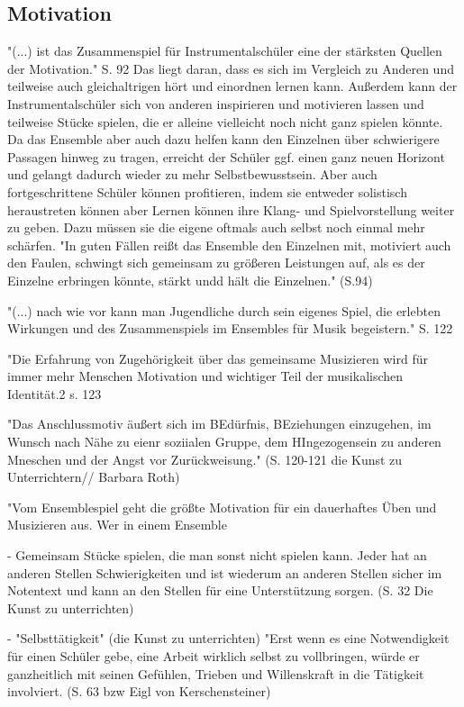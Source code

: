 \subsection{Motivation}
"(...) ist das Zusammenspiel für Instrumentalschüler eine der stärksten Quellen
der Motivation." S. 92 Das liegt daran, dass es sich im Vergleich zu Anderen und
teilweise auch gleichaltrigen hört und einordnen lernen kann. Außerdem kann der Instrumentalschüler
sich von anderen inspirieren und motivieren lassen und teilweise Stücke spielen,
die er alleine vielleicht noch nicht ganz spielen könnte. Da das Ensemble aber
auch dazu helfen kann den Einzelnen über schwierigere Passagen hinweg zu tragen,
erreicht der Schüler ggf. einen ganz neuen Horizont und gelangt dadurch wieder
zu mehr Selbstbewusstsein. Aber auch fortgeschrittene Schüler können
profitieren, indem sie entweder solistisch heraustreten können aber Lernen
können ihre Klang- und Spielvorstellung weiter zu geben. Dazu müssen sie die
eigene oftmals auch selbst noch einmal mehr schärfen. "In guten Fällen reißt das
Ensemble den Einzelnen mit, motiviert auch den Faulen, schwingt sich gemeinsam
zu größeren Leistungen auf, als es der Einzelne erbringen könnte, stärkt undd
hält die Einzelnen." (S.94)


"(...) nach wie vor kann man Jugendliche durch sein eigenes Spiel, die erlebten
Wirkungen und des Zusammenspiels im Ensembles für Musik begeistern." S. 122


"Die Erfahrung von Zugehörigkeit über das gemeinsame Musizieren wird für immer
mehr Menschen Motivation und wichtiger Teil der musikalischen Identität.2 s. 123

"Das Anschlussmotiv äußert sich im BEdürfnis, BEziehungen einzugehen, im Wunsch
nach Nähe zu eienr soziialen Gruppe, dem HIngezogensein zu anderen Mneschen und
der Angst vor Zurückweisung." (S. 120-121 die Kunst zu Unterrichtern// Barbara Roth)

"Vom Ensemblespiel geht die größte Motivation für ein dauerhaftes Üben und
Musizieren aus. Wer in einem Ensemble 



- Gemeinsam Stücke spielen, die man sonst nicht spielen kann. Jeder hat an
anderen Stellen Schwierigkeiten und ist wiederum an anderen Stellen sicher im
Notentext und kann an den Stellen für eine Unterstützung sorgen. (S. 32 Die
Kunst zu unterrichten)

- "Selbsttätigkeit" (die Kunst zu unterrichten)
"Erst wenn es eine Notwendigkeit für einen Schüler gebe, eine Arbeit wirklich
selbst zu vollbringen, würde er ganzheitlich mit seinen Gefühlen, Trieben und
Willenskraft in die Tätigkeit involviert. (S. 63 bzw Eigl von Kerschensteiner)


